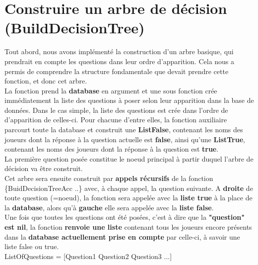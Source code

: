 \documentclass[12pt]{article}
\begin{document}
\section{Construire un arbre de décision (BuildDecisionTree)}

Tout abord, nous avons implémenté la construction d'un arbre basique, qui prendrait en compte les questions dans leur ordre d'apparition. Cela nous a permis de comprendre la structure fondamentale que devait prendre cette fonction, et donc cet arbre.\\

La fonction prend la \textbf{database} en argument et une sous fonction crée immédiatement la liste des questions à poser selon leur apparition dans la base de données. Dans le cas simple, la liste des questions est crée dans l'ordre de d'apparition de celles-ci. Pour chacune d'entre elles, la fonction auxiliaire parcourt toute la database et construit une \textbf{ListFalse}, contenant les noms des joueurs dont la réponse à la question actuelle est \textbf{false}, ainsi qu'une \textbf{ListTrue}, contenant les noms des joueurs dont la réponse à la question est \textbf{true}.\\
La première question posée constitue le noeud principal à partir duquel l'arbre de décision va être construit.\\ Cet arbre sera ensuite construit par \textbf{appels récursifs} de la fonction\\ {\selectfont \{BuidDecisionTreeAcc ..\}} avec, à chaque appel, la question suivante. A \textbf{droite} de toute question (=noeud), la fonction sera appelée avec la \textbf{liste true} à la place de la \textbf{database}, alors qu'à \textbf{gauche} elle sera appelée avec la \textbf{liste false}.\\

Une fois que toutes les questions ont été posées, c'est à dire que la \textbf{"question" est nil}, la fonction \textbf{renvoie une liste} contenant tous les joueurs encore présents dans la \textbf{database actuellement prise en compte} par celle-ci, à savoir une liste false ou true.\\


ListOfQuestions = [Question1 Question2 Question3 ...]\\
\end{document}
